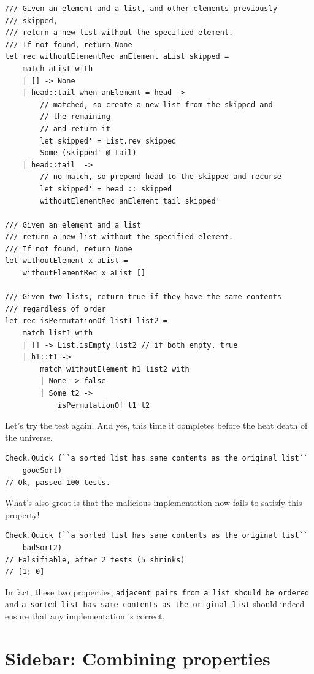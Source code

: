 \begin{verbatim}
/// Given an element and a list, and other elements previously 
/// skipped,
/// return a new list without the specified element.
/// If not found, return None
let rec withoutElementRec anElement aList skipped = 
	match aList with
	| [] -> None
	| head::tail when anElement = head -> 
		// matched, so create a new list from the skipped and 
		// the remaining
		// and return it
		let skipped' = List.rev skipped
		Some (skipped' @ tail)
	| head::tail  -> 
		// no match, so prepend head to the skipped and recurse 
		let skipped' = head :: skipped
		withoutElementRec anElement tail skipped' 

/// Given an element and a list
/// return a new list without the specified element.
/// If not found, return None
let withoutElement x aList = 
	withoutElementRec x aList [] 

/// Given two lists, return true if they have the same contents
/// regardless of order
let rec isPermutationOf list1 list2 = 
	match list1 with
	| [] -> List.isEmpty list2 // if both empty, true
	| h1::t1 -> 
		match withoutElement h1 list2 with
		| None -> false
		| Some t2 -> 
			isPermutationOf t1 t2
\end{verbatim}

Let's try the test again. And yes, this time it completes before the
heat death of the universe.

\begin{verbatim}
Check.Quick (``a sorted list has same contents as the original list``  
    goodSort)
// Ok, passed 100 tests.
\end{verbatim}
What's also great is that the malicious implementation now fails to
satisfy this property!

\begin{verbatim}
Check.Quick (``a sorted list has same contents as the original list``  
    badSort2)
// Falsifiable, after 2 tests (5 shrinks) 
// [1; 0]
\end{verbatim}
In fact, these two properties,
\texttt{adjacent\ pairs\ from\ a\ list\ should\ be\ ordered} and
\texttt{a\ sorted\ list\ has\ same\ contents\ as\ the\ original\ list}
should indeed ensure that any implementation is correct.

\section{Sidebar: Combining
properties}
\label{sidebar-combining-properties}

